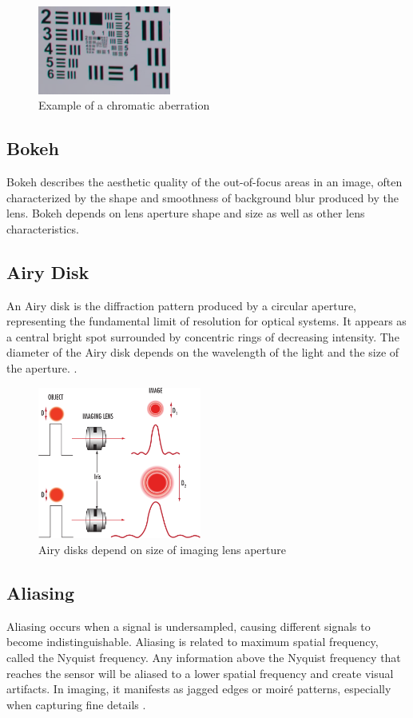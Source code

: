 \begin{figure}[h]
\centering
\includegraphics[height=2.9cm]{Images/chromatic_aberation_photo.png}
\caption{Example of a chromatic aberration \cite{ChromaticAberation}}
\label{fig:chrom_ab}
\end{figure}

\subsection{Bokeh}
Bokeh describes the aesthetic quality of the out-of-focus areas in an image, often characterized by the shape and smoothness of background blur produced by the lens. Bokeh depends on lens aperture shape and size as well as other lens characteristics.

\subsection{Airy Disk}
An Airy disk is the diffraction pattern produced by a circular aperture, representing the fundamental limit of resolution for optical systems. It appears as a central bright spot surrounded by concentric rings of decreasing intensity. The diameter of the Airy disk depends on the wavelength of the light and the size of the aperture. \cite{AiryDisk}.

\begin{figure}[htbp]
\centering
\includegraphics[height=5cm]{Images/airy_disk.png}
\caption{Airy disks depend on size of imaging lens aperture \cite{AiryDisk}}
\label{fig:airy_disk}
\end{figure}

\subsection{Aliasing}
Aliasing occurs when a signal is undersampled, causing different signals to become indistinguishable. Aliasing is related to maximum spatial frequency, called the Nyquist frequency. Any information above the Nyquist frequency that reaches the sensor will be aliased to a lower spatial frequency and create visual artifacts. In imaging, it manifests as jagged edges or moiré patterns, especially when capturing fine details \cite{Aliasing}.


